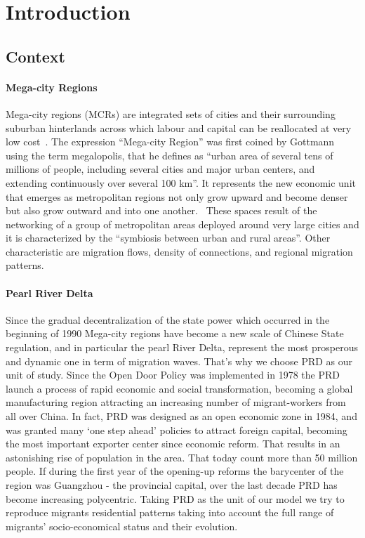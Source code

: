 \section{Introduction}


\subsection{Context}

\paragraph{Mega-city Regions}

Mega-city regions (MCRs) are integrated sets of cities and their surrounding suburban hinterlands across which labour and capital can be reallocated at very low cost~\cite{florida2008rise}. The expression ``Mega-city Region'' was first coined by Gottmann~\cite{gottman1961megalopolis} using the term megalopolis, that he defines as “urban area of several tens of millions of people, including several cities and major urban centers, and extending continuously over several 100 km”. It represents the new economic unit that emerges as metropolitan regions not only grow upward and become denser but also grow outward and into one another.  These spaces result of the networking of a group of metropolitan areas deployed around very large cities and it is characterized by the “symbiosis between urban and rural areas”.  Other characteristic are migration flows, density of connections, and regional migration patterns. 



\paragraph{Pearl River Delta}

Since the gradual decentralization of the state power which occurred in the beginning of  1990 Mega-city regions have become a new scale of Chinese State regulation, and in particular the pearl River Delta, represent the most prosperous and dynamic one in term of migration waves. That’s why we choose PRD as our unit of study. Since the Open Door Policy was implemented in 1978 the PRD launch a process of rapid economic and social transformation, becoming a global manufacturing region attracting an increasing number of migrant-workers from all over China. In fact, PRD was designed as an open economic zone in 1984, and was granted many ‘one step ahead’ policies to attract foreign capital, becoming the most important exporter center since economic reform. That results in an astonishing rise of population in the area. That today count more than 50 million people. If during the first year of the opening-up reforms the barycenter of the region was Guangzhou - the provincial capital, over the last decade PRD has become increasing polycentric.
Taking PRD as the unit of our model we try to reproduce migrants residential patterns taking into account the full range of migrants’ socio-economical status and their evolution. 



